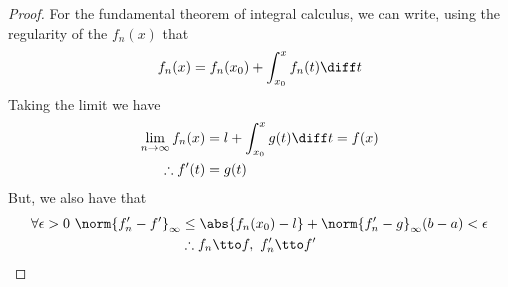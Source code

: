 \documentclass[../mmf.tex]{subfiles}
\begin{document}
\begin{proof}
	For the fundamental theorem of integral calculus, we can write, using the regularity of the $f_n(x)$ that
	\begin{equation*}
		f_n(x)=f_n(x_0)+\int_{x_0}^{x}f_n(t)\diff t
	\end{equation*}
	Taking the limit we have
	\begin{equation*}
		\begin{aligned}
			\lim_{n\to\infty}f_n(x)&=l+\int_{x_0}^{x}g(t)\diff t=f(x)\\
			\therefore f'(t)&=g(t)
		\end{aligned}
	\end{equation*}
	But, we also have that
	\begin{equation*}
		\begin{aligned}
			\forall\epsilon>0\ \norm{f_n'-f'}_\infty&\le\abs{f_n(x_0)-l}+\norm{f_n'-g}_\infty(b-a)<\epsilon\\
			&\therefore f_n\tto f,\ f_n'\tto f'
		\end{aligned}
	\end{equation*}
\end{proof}
\end{document}
